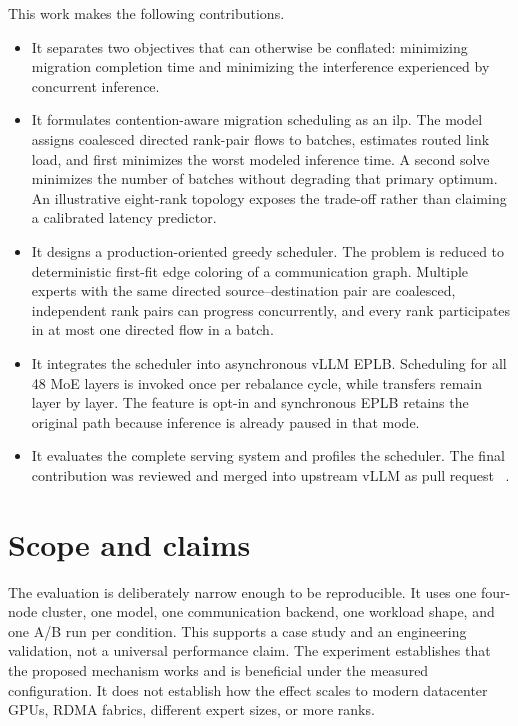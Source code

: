 This work makes the following contributions.

\begin{itemize}
  \item It separates two objectives that can otherwise be conflated: minimizing
  migration completion time and minimizing the interference experienced by
  concurrent inference.

  \item It formulates contention-aware migration scheduling as an \gls{ilp}.
  The model assigns coalesced directed rank-pair flows to batches, estimates
  routed link load, and first minimizes the worst modeled inference time. A
  second solve minimizes the number of batches without degrading that primary
  optimum. An illustrative eight-rank topology exposes the trade-off rather
  than claiming a calibrated latency predictor.

  \item It designs a production-oriented greedy scheduler. The problem is
  reduced to deterministic first-fit edge coloring of a communication graph.
  Multiple experts with the same directed source--destination pair are
  coalesced, independent rank pairs can progress concurrently, and every rank
  participates in at most one directed flow in a batch.

  \item It integrates the scheduler into asynchronous vLLM EPLB. Scheduling
  for all 48 MoE layers is invoked once per rebalance cycle, while transfers
  remain layer by layer. The feature is opt-in and synchronous EPLB retains the
  original path because inference is already paused in that mode.

  \item It evaluates the complete serving system and profiles the scheduler.
  The final contribution was reviewed and merged into upstream vLLM as pull
  request \prnumber\ \cite{vllmpr52641}.
\end{itemize}

\section{Scope and claims}

The evaluation is deliberately narrow enough to be reproducible. It uses one
four-node cluster, one model, one communication backend, one workload shape,
and one A/B run per condition. This supports a case study and an engineering
validation, not a universal performance claim. The experiment establishes
that the proposed mechanism works and is beneficial under the measured
configuration. It does not establish how the effect scales to modern
datacenter GPUs, RDMA fabrics, different expert sizes, or more ranks.

